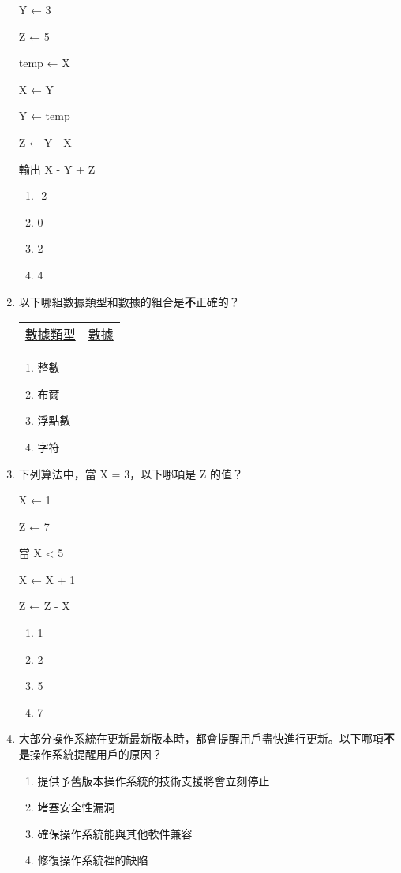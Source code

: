 \documentclass[12pt,a4paper]{article}
\begin{document}
\begin{enumerate}
Y ← 3

Z ← 5

temp ← X

X ← Y

Y ← temp

Z ← Y - X

輸出 X - Y + Z

\begin{enumerate}[label=\Alph*.]
\item -2
\item 0
\item 2
\item 4
\end{enumerate}

\item 以下哪組數據類型和數據的組合是\textbf{不}正確的？

\begin{center}
\begin{tabular}{cc}
\underline{數據類型} & \underline{數據} \\
\end{tabular}
\end{center}

\begin{enumerate}[label=\Alph*.]
\item 整數 
\item 布爾 
\item 浮點數 
\item 字符 
\end{enumerate}

\item 下列算法中，當 X = 3，以下哪項是 Z 的值？

X ← 1

Z ← 7

當 X < 5

X ← X + 1

Z ← Z - X

\begin{enumerate}[label=\Alph*.]
\item 1
\item 2
\item 5
\item 7
\end{enumerate}

\item 大部分操作系統在更新最新版本時，都會提醒用戶盡快進行更新。以下哪項\textbf{不是}操作系統提醒用戶的原因？

\begin{enumerate}[label=\Alph*.]
\item 提供予舊版本操作系統的技術支援將會立刻停止
\item 堵塞安全性漏洞
\item 確保操作系統能與其他軟件兼容
\item 修復操作系統裡的缺陷
\end{enumerate}


\end{enumerate}
\end{document}
